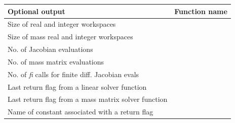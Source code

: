 \documentclass[letterpaper,10pt,english]{sphinxmanual}
\begin{document}
\begin{tabulary}{\linewidth}{|L|L|}
\hline
\textbf{
Optional output
} & \textbf{
Function name
}\\\hline

Size of real and integer workspaces
 & 
{\hyperref[c_interface/User_callable:ARKDlsGetWorkSpace]{}}
\\\hline

Size of mass real and integer workspaces
 & 
{\hyperref[c_interface/User_callable:ARKDlsGetMassWorkSpace]{}}
\\\hline

No. of Jacobian evaluations
 & 
{\hyperref[c_interface/User_callable:ARKDlsGetNumJacEvals]{}}
\\\hline

No. of mass matrix evaluations
 & 
{\hyperref[c_interface/User_callable:ARKDlsGetNumMassEvals]{}}
\\\hline

No. of \emph{fi} calls for finite diff. Jacobian evals
 & 
{\hyperref[c_interface/User_callable:ARKDlsGetNumRhsEvals]{}}
\\\hline

Last return flag from a linear solver function
 & 
{\hyperref[c_interface/User_callable:ARKDlsGetLastFlag]{}}
\\\hline

Last return flag from a mass matrix solver function
 & 
{\hyperref[c_interface/User_callable:ARKDlsGetLastMassFlag]{}}
\\\hline

Name of constant associated with a return flag
 & 
{\hyperref[c_interface/User_callable:ARKDlsGetReturnFlagName]{}}
\\\hline
\end{tabulary}

\end{document}
